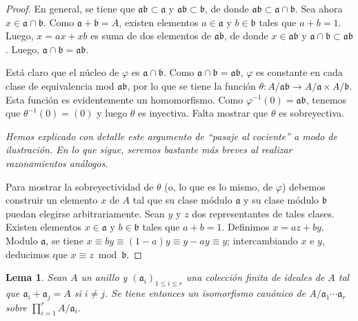 \documentclass[oneside,bibtotoc,leqno,spanish]{amsbook}
\newcommand{\idl}[1]{\mathfrak{#1}}
\newcommand{\QED}{}%
\renewcommand{\to}[1][]{\xrightarrow{#1}}
\numberwithin{equation}{section}
\newenvironment{comm}%
	{\begin{trivlist}\item\small\itshape}
	{\end{trivlist}}
\theoremstyle{defi}
\theoremstyle{note}
\newtheorem{lemma}{Lema}
\theoremstyle{rem}
\numberwithin{theorem}{section}
\numberwithin{proposition}{section}
\numberwithin{definition}{section}
\numberwithin{lemma}{section}
\numberwithin{corollary}{section}
\numberwithin{example}{section}
\numberwithin{footnote}{section}%
\begin{document}
\begin{proof}
En general, se tiene que $\idl{a}\idl{b}\subset\idl{a}$ y $\idl{a}\idl{b}\subset\idl{b}$, de
donde $\idl{a}\idl{b}\subset\idl{a}\cap\idl{b}$. Sea ahora $x\in\idl{a}\cap\idl{b}$.
Como $\idl{a}+\idl{b}=A$, existen elementos $a\in\idl{a}$ y $b\in\idl{b}$ tales
que $a+b=1$. Luego, $x = ax+xb$ es suma de dos elementos de $\idl{a}\idl{b}$, de donde
$x\in\idl{a}\idl{b}$ y $\idl{a}\cap\idl{b}\subset\idl{a}\idl{b}$. Luego,
$\idl{a}\cap\idl{b} = \idl{a}\idl{b}$.

Est\'a claro que el n\'ucleo de $\varphi$ es $\idl{a}\cap\idl{b}$. Como $\idl{a}\cap\idl{b}
=\idl{a}\idl{b}$, $\varphi$ es constante en cada clase de equivalencia mod $\idl{a}\idl{b}$,
por lo que se tiene la funci\'on $\theta : A/\idl{a}\idl{b}\to A/\idl{a}\times A/\idl{b}$.
Esta funci\'on es evidentemente un homomorfismo. Como $\varphi^{-1}(0) = \idl{a}\idl{b}$,
tenemos que $\theta^{-1}(0) = (0)$ y luego $\theta$ es inyectiva. Falta mostrar que $\theta$
es sobreyectiva.

\begin{comm}
Hemos explicado con detalle este argumento de ``pasaje al cociente'' a modo de ilustraci\'on.
En lo que sigue, seremos bastante m\'as breves al realizar razonamientos an\'alogos.
\end{comm}

Para mostrar la sobreyectividad de $\theta$ (o, lo que es lo mismo, de $\varphi$) debemos construir
un elemento $x$ de $A$ tal que su clase m\'odulo $\idl{a}$ y su clase m\'odulo $\idl{b}$ puedan
elegirse arbitrariamente. Sean $y$ y $z$ dos representantes de tales clases. Existen elementos
$x\in\idl{a}$ y $b\in\idl{b}$ tales que $a+b=1$. Definimos $x = az+by$. Modulo $\idl{a}$,
se tiene $x\equiv by\equiv (1-a)y\equiv y-ay\equiv y$; intercambiando $x$ e $y$, deducimos
que $x\equiv z\bmod\idl{b}$. \QED
\end{proof}

\begin{lemma}\label{lem1.3.2}
Sean $A$ un anillo y $(\idl{a}_{i})_{1\leq i\leq r}$ una colecci\'on finita de ideales de $A$
tal que $\idl{a}_{i}+\idl{a}_{j} = A$ si $i\neq j$. Se tiene entonces un isomorfismo can\'onico
de $A/\idl{a}_{1}\cdots\idl{a}_{r}$ sobre $\prod_{i=1}^{r}A/\idl{a}_{i}$.
\end{lemma}
\end{document}
